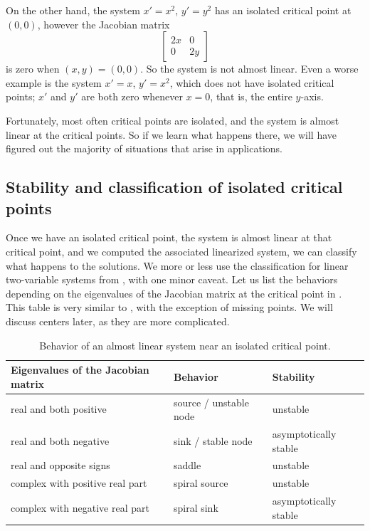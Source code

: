 On the other hand, the system $x' = x^2$, $y' = y^2$ has an isolated
critical point at $(0,0)$, however the Jacobian matrix
\begin{equation*}
\begin{bmatrix} 2x & 0 \\ 0 & 2y \end{bmatrix}
\end{equation*}
is zero when $(x,y) = (0,0)$.  So the system is not almost
linear.
Even a worse example is the system $x' = x$, $y' = x^2$, which does not have 
isolated critical points; $x'$ and $y'$ are both zero
whenever $x=0$, that is, the entire $y$-axis.

Fortunately, most often critical
points are isolated, and the system is almost linear at the critical
points.  So if we learn what happens there, we will have figured out the majority
of situations that arise in applications.



\subsection{Stability and classification of isolated critical points}

Once we have an isolated critical point, the system is almost linear at
that critical point, and we computed the
associated linearized system, we can classify what happens to the 
solutions.  We more or less use the classification for linear
two-variable systems from , with one minor
caveat.
Let us list the behaviors depending on the eigenvalues of
the Jacobian matrix at the critical point in .
This table is very similar to , with
the exception of missing  points.
We will discuss centers later, as they are more complicated.

\begin{table}[h!t]
\mybeginframe
\capstart
\begin{center}
\begin{tabular}{@{}lll@{}}
\toprule
Eigenvalues of the Jacobian matrix & Behavior & Stability \\
\midrule
real and both positive & source / unstable node & unstable \\
real and both negative & sink / stable node & asymptotically stable \\
real and opposite signs & saddle & unstable \\
complex with positive real part & spiral source & unstable \\
complex with negative real part & spiral sink & asymptotically stable \\
\bottomrule
\end{tabular}
\end{center}
\caption{Behavior of an almost linear system near an isolated critical
point.  \label{pln:behtab2}}
\myendframe
\end{table}

